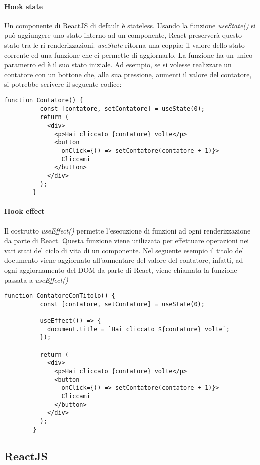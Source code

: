 \documentclass[a4paper]{article}
\begin{document}
      \paragraph{Hook state}
      Un componente di ReactJS di default è stateless. Usando la funzione \emph{useState()} si può
      aggiungere uno stato interno ad un componente, React preserverà questo stato tra le ri-renderizzazioni.
      \emph{useState} ritorna una coppia: il valore dello stato corrente ed una funzione che ci permette di aggiornarlo.
      La funzione ha un unico parametro ed è il suo stato iniziale. Ad esempio, se si volesse realizzare un contatore con un bottone che, alla sua pressione,
      aumenti il valore del contatore, si potrebbe scrivere il seguente codice:
      \begin{lstlisting}[style=ES6, title={Esempio contatore con stato interno}]
        function Contatore() {
          const [contatore, setContatore] = useState(0);
          return (
            <div>
              <p>Hai cliccato {contatore} volte</p>
              <button 
                onClick={() => setContatore(contatore + 1)}>
                Cliccami
              </button>
            </div>
          );
        }
      \end{lstlisting}

      \paragraph{Hook effect}
      Il costrutto \emph{useEffect()} permette l'esecuzione di funzioni ad ogni renderizzazione da parte di React.
      Questa funzione viene utilizzata per effettuare operazioni nei vari stati del ciclo di vita di un componente.
      \newline
      Nel seguente esempio il titolo del documento viene aggiornato all'aumentare del valore del contatore, infatti, 
      ad ogni aggiornamento del DOM da parte di React, viene chiamata la funzione passata a \emph{useEffect()}
      \begin{lstlisting}[style=ES6, title={Esempio uso di useEffect()}]
        function ContatoreConTitolo() {
          const [contatore, setContatore] = useState(0);

          useEffect(() => {
            document.title = `Hai cliccato ${contatore} volte`;
          });

          return (
            <div>
              <p>Hai cliccato {contatore} volte</p>
              <button
                onClick={() => setContatore(contatore + 1)}>
                Cliccami
              </button>
            </div>
          );
        }\end{lstlisting}

        \subsection{ReactJS}
\end{document}

